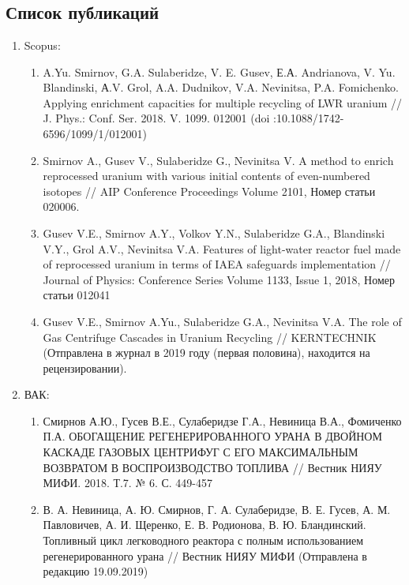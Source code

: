 \chapter{}\label{app:A}

\section{Список публикаций}\label{app:A1}

\begin{enumerate}
	\item Scopus:
    \begin{enumerate}
        \item A.Yu. Smirnov, G.A. Sulaberidze, V. E. Gusev, Е.А. Andrianova, V. Yu. Blandinski, А.V. Grol, A.A. Dudnikov, V.A. Nevinitsa, P.A. Fomichenko. Applying enrichment capacities for multiple recycling of LWR uranium //  J. Phys.: Conf. Ser. 2018. V. 1099. 012001 (doi :10.1088/1742-6596/1099/1/012001)
        \item Smirnov A., Gusev V., Sulaberidze G., Nevinitsa V. A method to enrich reprocessed uranium with various initial contents of even-numbered isotopes // AIP Conference Proceedings Volume 2101, Номер статьи 020006.
        \item Gusev V.E., Smirnov A.Y., Volkov Y.N., Sulaberidze G.A., Blandinski V.Y., Grol A.V., Nevinitsa V.A. Features of light-water reactor fuel made of reprocessed uranium in terms of IAEA safeguards implementation // Journal of Physics: Conference Series
        Volume 1133, Issue 1, 2018, Номер статьи 012041
        \item Gusev V.E., Smirnov A.Yu., Sulaberidze G.A., Nevinitsa V.A. The role of Gas Centrifuge Cascades in Uranium Recycling // KERNTECHNIK (Отправлена в журнал в 2019 году (первая половина), находится на рецензировании).
    \end{enumerate}
    \item ВАК:
    \begin{enumerate}
        \item Смирнов А.Ю., Гусев В.Е., Сулаберидзе Г.А., Невиница В.А., Фомиченко П.А. ОБОГАЩЕНИЕ РЕГЕНЕРИРОВАННОГО УРАНА В ДВОЙНОМ КАСКАДЕ ГАЗОВЫХ ЦЕНТРИФУГ С ЕГО МАКСИМАЛЬНЫМ ВОЗВРАТОМ В ВОСПРОИЗВОДСТВО ТОПЛИВА // Вестник НИЯУ МИФИ. 2018. Т.7. № 6. С. 449-457
        \item В. А. Невиница, А. Ю. Смирнов, Г. А. Сулаберидзе, В. Е. Гусев, А. М. Павловичев, А. И. Щеренко, Е. В. Родионова, В. Ю. Бландинский. Топливный цикл легководного реактора с полным использованием регенерированного урана // Вестник НИЯУ МИФИ (Отправлена в редакцию 19.09.2019)

\end{enumerate}
\end{enumerate}
